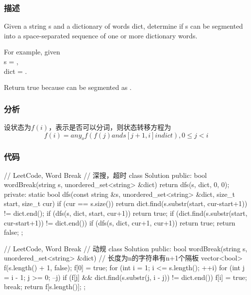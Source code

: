 \subsubsection{描述}
Given a string s and a dictionary of words dict, determine if s can be segmented into a space-separated sequence of one or more dictionary words.

For example, given \\
s = ,\\
dict = .

Return true because  can be segmented as .


\subsubsection{分析}
设状态为$f(i)$，表示是否可以分词，则状态转移方程为
$$
f(i) = any_of(f(j) and s[j+1,i] in dict),  0 \leq j < i
$$


\subsubsection{代码}
\begin{Code}
// LeetCode, Word Break
// 深搜，超时
class Solution {
public:
    bool wordBreak(string s, unordered_set<string> &dict) {
        return dfs(s, dict, 0, 0);
    }
private:
    static bool dfs(const string &s, unordered_set<string> &dict,
            size_t start, size_t cur) {
        if (cur == s.size()) {
            return dict.find(s.substr(start, cur-start+1)) != dict.end();
        }
        if (dfs(s, dict, start, cur+1)) return true;
        if (dict.find(s.substr(start, cur-start+1)) != dict.end())
            if (dfs(s, dict, cur+1, cur+1)) return true;
        return false;
    }
};
\end{Code}

\begin{Code}
// LeetCode, Word Break
// 动规
class Solution {
public:
    bool wordBreak(string s, unordered_set<string> &dict) {
        // 长度为n的字符串有n+1个隔板
        vector<bool> f(s.length() + 1, false);
        f[0] = true;
        for (int i = 1; i <= s.length(); ++i) {
            for (int j = i - 1; j >= 0; --j) {
                if (f[j] && dict.find(s.substr(j, i - j)) != dict.end()) {
                    f[i] = true;
                    break;
                }
            }
        }
        return f[s.length()];
    }
};
\end{Code}


